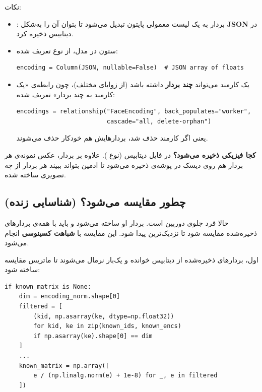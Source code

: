 \documentclass[12pt,a4paper]{article}
\begin{document}
نکات:
\begin{itemize}[rightmargin=0pt]
  \item {}: بردار  به یک لیست معمولی پایتون تبدیل می‌شود تا بتوان آن را به‌شکل \textbf{JSON} در دیتابیس ذخیره کرد.
  \item ستون  در مدل، از نوع  تعریف شده:
\begin{latin}
\begin{lstlisting}
encoding = Column(JSON, nullable=False)  # JSON array of floats
\end{lstlisting}
\end{latin}
  \item یک کارمند می‌تواند \textbf{چند بردار} داشته باشد (از زوایای مختلف)، چون رابطه‌ی «یک کارمند به چند بردار» تعریف شده:
\begin{latin}
\begin{lstlisting}
encodings = relationship("FaceEncoding", back_populates="worker",
                         cascade="all, delete-orphan")
\end{lstlisting}
\end{latin}
   یعنی اگر کارمند حذف شد، بردارهایش هم خودکار حذف می‌شوند.
\end{itemize}

\begin{note}
\textbf{کجا فیزیکی ذخیره می‌شود؟} در فایل دیتابیس  (نوع ). علاوه بر بردار، عکس نمونه‌ی هر بردار هم روی دیسک در پوشه‌ی  ذخیره می‌شود تا ادمین بتواند ببیند هر بردار از چه تصویری ساخته شده.
\end{note}

\subsection{چطور مقایسه می‌شود؟ (شناسایی زنده)}
حالا فرد جلوی دوربین است. بردار او ساخته می‌شود و باید با همه‌ی بردارهای ذخیره‌شده مقایسه شود تا نزدیک‌ترین پیدا شود. این مقایسه با \textbf{شباهت کسینوسی} انجام می‌شود.

اول، بردارهای ذخیره‌شده از دیتابیس خوانده و یک‌بار نرمال می‌شوند تا ماتریس مقایسه ساخته شود:

\begin{latin}
\begin{lstlisting}
if known_matrix is None:
    dim = encoding_norm.shape[0]
    filtered = [
        (kid, np.asarray(ke, dtype=np.float32))
        for kid, ke in zip(known_ids, known_encs)
        if np.asarray(ke).shape[0] == dim
    ]
    ...
    known_matrix = np.array([
        e / (np.linalg.norm(e) + 1e-8) for _, e in filtered
    ])
\end{lstlisting}
\end{latin}
\end{document}
